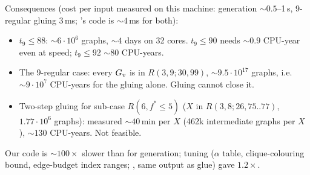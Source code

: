 Consequences (cost per input measured on this machine: generation ${\sim}0.5$--1\,s, 9-regular gluing 3\,ms;
\cite{Ang}'s code is ${\sim}4$\,ms for both):
\begin{itemize}
\item $t_9 \le 88$: ${\sim}6\cdot 10^{6}$ graphs, ${\sim}4$ days on 32 cores. $t_9 \le 90$ needs ${\sim}0.9$ CPU-year even at \cite{Ang} speed;
  $t_9 \le 92$ ${\sim}80$ CPU-years.
\item The 9-regular case: every $G_{v}$ is in $R(3,9;30,99)$, ${\sim}9.5\cdot 10^{17}$ graphs, i.e.\ ${\sim}9\cdot 10^{7}$ CPU-years for the gluing alone.
  Gluing cannot close it.
\item Two-step gluing for sub-case $R(6, f^* \le 5)$ ($X$ in $R(3,8;26,75..77)$, $1.77\cdot 10^{6}$ graphs): measured
  ${\sim}40$\,min per $X$ (462k intermediate graphs per $X$), ${\sim}130$ CPU-years. Not feasible.
\end{itemize}
Our code is ${\sim}100\times$ slower than \cite{Ang} for generation; tuning ($\alpha$ table, clique-colouring bound,
edge-budget index ranges; , same output as glue) gave $1.2\times$.
